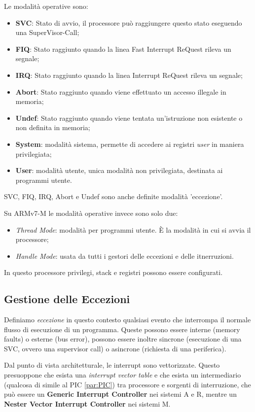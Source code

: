 Le modalità operative sono:
\begin{itemize}
    \item \textbf{SVC}: Stato di avvio, il processore può raggiungere questo stato eseguendo una SuperVisor-Call;
    \item \textbf{FIQ}: Stato raggiunto quando la linea Fast Interrupt ReQuest rileva un segnale;
    \item \textbf{IRQ}: Stato raggiunto quando la linea Interrupt ReQuest rileva un segnale;
    \item \textbf{Abort}: Stato raggiunto quando viene effettuato un accesso illegale in memoria;
    \item \textbf{Undef}: Stato raggiunto quando viene tentata un'istruzione non esistente o non definita in memoria;
    \item \textbf{System}: modalità sistema, permette di accedere ai registri \textit{user} in maniera privilegiata;
    \item \textbf{User}: modalità utente, unica modalità non privilegiata, destinata ai programmi utente.
\end{itemize}

SVC, FIQ, IRQ, Abort e Undef sono anche definite modalità 'eccezione'.

Su ARMv7-M le modalità operative invece sono solo due:
\begin{itemize}
    \item \textit{Thread Mode}: modalità per programmi utente. \uppercase{è} la modalità in cui si avvia il processore;
    \item \textit{Handle Mode}: usata da tutti i gestori delle eccezioni e delle itnerruzioni.
\end{itemize}

In questo processore privilegi, stack e registri possono essere configurati.

\subsection{Gestione delle Eccezioni}
Definiamo \textit{eccezione} in questo contesto qualsiasi evento che interrompa il normale flusso di esecuzione di un programma. Queste possono essere interne (memory faults) o esterne (bus error), possono essere inoltre sincrone (esecuzione di una SVC, ovvero una supervisor call) o asincrone (richiesta di una periferica). 

Dal punto di vista architetturale, le interrupt sono vettorizzate. Questo presuoppone che esista una \textit{interrupt vector table} e che esista un intermediario (qualcosa di simile al PIC \ref{par:PIC}) tra processore e sorgenti di interruzione, che può essere un \textbf{Generic Interrupt Controller} nei sistemi A e R, mentre un \textbf{Nester Vector Interrupt Controller} nei sistemi M. 

